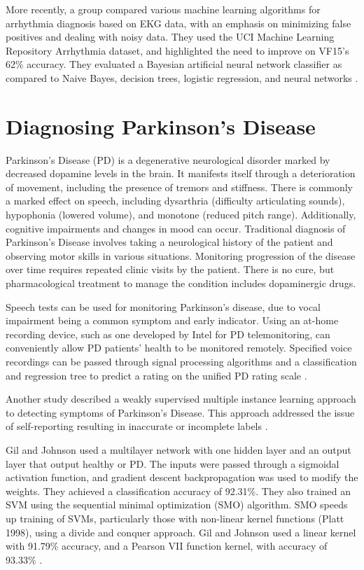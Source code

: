 \documentclass[draftcopy]{srpaper}
\begin{document}
More recently, a group compared various machine learning algorithms for arrhythmia
diagnosis based on EKG data, with an emphasis on minimizing false
positives and dealing with noisy data. They used the UCI Machine
Learning Repository Arrhythmia dataset, and highlighted the need to
improve on VF15’s 62\% accuracy. They evaluated a Bayesian artificial neural network classifier as compared to Naive Bayes, decision trees, logistic regression, and neural networks \cite{GMCL05}.

\section{Diagnosing Parkinson's Disease}
Parkinson's Disease (PD) is a degenerative neurological disorder
marked by decreased dopamine levels in the brain. It manifests itself
through a deterioration of movement,
including the presence of tremors and stiffness. There is commonly a
marked effect on speech, including dysarthria (difficulty articulating
sounds), hypophonia (lowered volume), and monotone (reduced pitch
range). 
Additionally, 
cognitive impairments and changes in mood can occur.
Traditional diagnosis of Parkinson's Disease involves taking a
neurological history of the patient and observing motor skills in
various situations. Monitoring progression of the disease over time requires repeated clinic visits by the patient. There is no cure, but pharmacological treatment to
manage the condition includes dopaminergic drugs. 

Speech tests can be used for monitoring Parkinson’s disease, due to
vocal impairment being a common symptom and early indicator. Using an
at-home recording device, such as one developed by Intel for PD
telemonitoring, can conveniently allow PD patients' health to be monitored
remotely. Specified voice recordings can be passed through signal processing algorithms and a
classification and regression tree to predict a rating on the unified
PD rating scale \cite{TLMR10}.

Another study described a weakly supervised multiple instance learning
approach to detecting symptoms of Parkinson’s Disease. This approach
addressed the issue of self-reporting resulting in inaccurate or
incomplete labels \cite{DAlTH12}.

Gil and Johnson used a multilayer network with one hidden layer
and an output layer that output healthy or PD. The inputs were passed
through a sigmoidal activation function, and gradient descent
backpropagation was used to modify the weights. They achieved a
classification accuracy of 92.31\%.
They also trained an SVM using the sequential minimal
optimization (SMO) algorithm. SMO speeds up training
of SVMs, particularly those with non-linear kernel functions (Platt
1998), using a divide and conquer approach. Gil and Johnson used a
linear kernel with 91.79\% accuracy, and a Pearson VII function
kernel, with accuracy of 93.33\% \cite{GJ70}.
\end{document}
